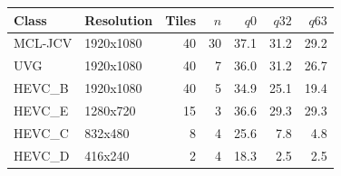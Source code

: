 \begin{tabular}{llrrrrr}
\toprule
Class & Resolution & Tiles & $n$ & $q0$ & $q32$ & $q63$ \\
\midrule
MCL-JCV & 1920x1080 & 40 & 30 & 37.1 & 31.2 & 29.2 \\
UVG & 1920x1080 & 40 & 7 & 36.0 & 31.2 & 26.7 \\
HEVC\_B & 1920x1080 & 40 & 5 & 34.9 & 25.1 & 19.4 \\
HEVC\_E & 1280x720 & 15 & 3 & 36.6 & 29.3 & 29.3 \\
HEVC\_C & 832x480 & 8 & 4 & 25.6 & 7.8 & 4.8 \\
HEVC\_D & 416x240 & 2 & 4 & 18.3 & 2.5 & 2.5 \\
\bottomrule
\end{tabular}
